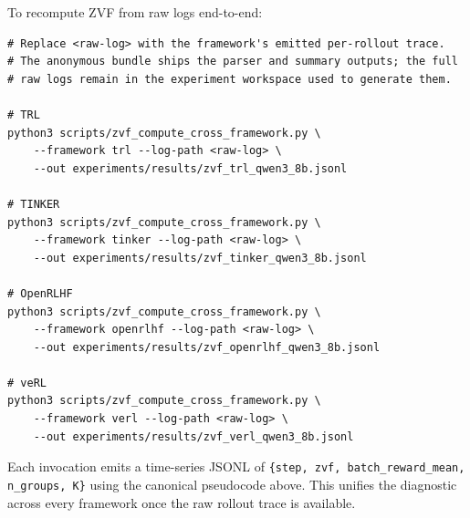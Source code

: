 To recompute ZVF from raw logs end-to-end:
\begin{verbatim}
# Replace <raw-log> with the framework's emitted per-rollout trace.
# The anonymous bundle ships the parser and summary outputs; the full
# raw logs remain in the experiment workspace used to generate them.

# TRL
python3 scripts/zvf_compute_cross_framework.py \
    --framework trl --log-path <raw-log> \
    --out experiments/results/zvf_trl_qwen3_8b.jsonl

# TINKER
python3 scripts/zvf_compute_cross_framework.py \
    --framework tinker --log-path <raw-log> \
    --out experiments/results/zvf_tinker_qwen3_8b.jsonl

# OpenRLHF
python3 scripts/zvf_compute_cross_framework.py \
    --framework openrlhf --log-path <raw-log> \
    --out experiments/results/zvf_openrlhf_qwen3_8b.jsonl

# veRL
python3 scripts/zvf_compute_cross_framework.py \
    --framework verl --log-path <raw-log> \
    --out experiments/results/zvf_verl_qwen3_8b.jsonl
\end{verbatim}
Each invocation emits a time-series JSONL of
\texttt{\{step, zvf, batch\_reward\_mean, n\_groups, K\}} using the
canonical pseudocode above. This unifies the diagnostic across every
framework once the raw rollout trace is available.
